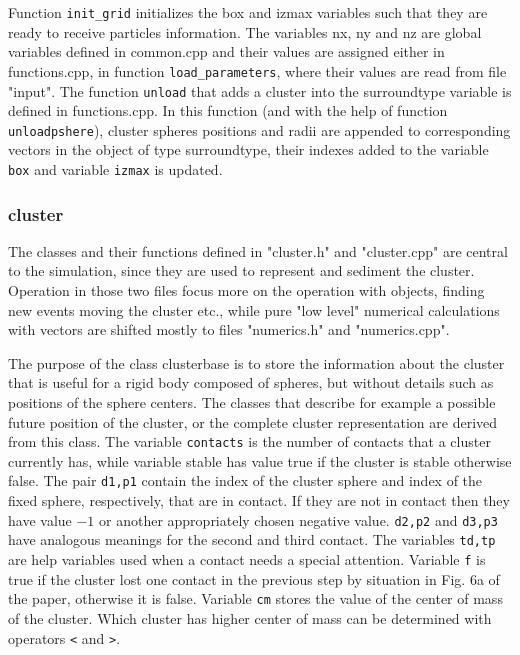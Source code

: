 \documentclass[12pt]{article}
\begin{document}
Function \texttt{init\_grid} initializes the box and izmax variables such that they are ready to receive particles information. The variables nx, ny and nz are global variables defined in common.cpp and their values are assigned either in functions.cpp, in function \texttt{load\_parameters}, where their values are read from file "input". 
The function \texttt{unload} that adds a cluster into the surroundtype variable is defined in functions.cpp. In this function (and with the help of function \texttt{unloadpshere}), cluster spheres positions and radii are appended to corresponding vectors in the object of type surroundtype, their indexes added to the variable \texttt{box} and variable \texttt{izmax} is updated.

\subsubsection{cluster}
The classes and their functions defined in "cluster.h" and "cluster.cpp" are central to the simulation, since they are used to represent and sediment the cluster. Operation in those two files focus more on the operation with objects, finding new events moving the cluster etc., while pure "low level" numerical calculations with vectors are shifted mostly to files "numerics.h" and "numerics.cpp".  

The purpose of the class clusterbase is to store the information about the cluster that is useful for a rigid body composed of spheres, but without details such as positions of the sphere centers. The classes that describe for example a possible future position of the cluster, or the complete cluster representation are derived from this class. The variable \texttt{contacts} is the number of contacts that a cluster currently has, while variable stable has value true if the cluster is stable otherwise false. The pair \texttt{d1,p1} contain the index of the cluster sphere and index of the fixed sphere, respectively, that are in contact. If they are not in contact then they have value $-1$ or another appropriately chosen negative value. \texttt{d2,p2} and \texttt{d3,p3} have analogous meanings for the second and third contact. The variables \texttt{td,tp} are help variables used when a contact needs a special attention. Variable \texttt{f} is true if the cluster lost one contact in the previous step by situation in Fig. 6a of the paper, otherwise it is false. Variable \texttt{cm} stores the value of the center of mass of the cluster. Which cluster has higher center of mass can be determined with operators \texttt{<} and \texttt{>}.
\end{document}
